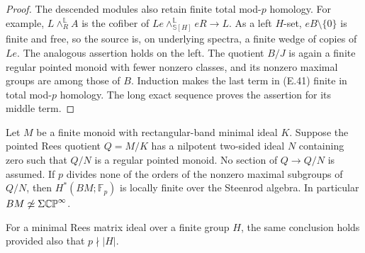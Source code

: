 \begin{proof}
The descended modules also retain finite total mod-$p$ homology.
For example, $L\wedge_R^{\mathbb L}A$ is the cofiber of
$Le\wedge_{\mathbb S[H]}^{\mathbb L}eR\to L$.
As a left $H$-set, $eB\setminus\{0\}$ is finite and free, so the
source is, on underlying spectra, a finite wedge of copies of $Le$.
The analogous assertion holds on the left.  The quotient $B/J$ is
again a finite regular pointed monoid with fewer nonzero classes,
and its nonzero maximal groups are among those of $B$.
Induction makes the last term in (E.41) finite in total mod-$p$
homology.  The long exact sequence proves the assertion for its
middle term.
\end{proof}

\begin{theorem}\label{E:nilpotent-ideal-regular-quotient}
Let $M$ be a finite monoid with rectangular-band minimal ideal $K$.
Suppose the pointed Rees quotient $Q=M/K$ has a nilpotent two-sided
ideal $N$ containing zero such that $Q/N$ is a regular pointed
monoid.  No section of $Q\to Q/N$ is assumed.
If $p$ divides none of the orders of the nonzero maximal subgroups
of $Q/N$, then $H^*(BM;\mathbb F_p)$ is locally finite over the
Steenrod algebra.  In particular $BM\not\simeq\Sigma\mathbb {CP}^\infty$.

For a minimal Rees matrix ideal over a finite group $H$, the same
conclusion holds provided also that $p\nmid|H|$.
\end{theorem}

